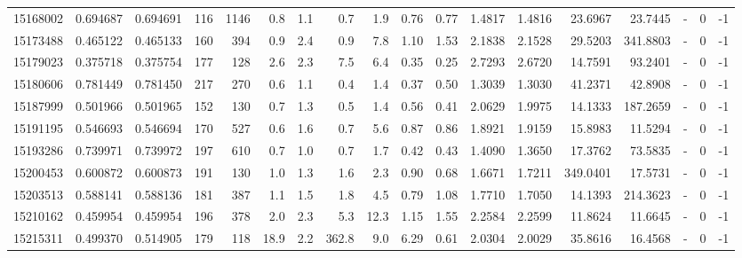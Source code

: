 \begin{tabular}{rrrrrrrrrrrrrrrlrr}
  15168002 & 0.694687 &   0.694691 &  116 & 1146 &      0.8 &      1.1 &     0.7 &      1.9 &       0.76 &        0.77 &  1.4817 &  1.4816 &   23.6967 &   23.7445 &             - &        0 &         -1 \\
  15173488 & 0.465122 &   0.465133 &  160 &  394 &      0.9 &      2.4 &     0.9 &      7.8 &       1.10 &        1.53 &  2.1838 &  2.1528 &   29.5203 &  341.8803 &             - &        0 &         -1 \\
  15179023 & 0.375718 &   0.375754 &  177 &  128 &      2.6 &      2.3 &     7.5 &      6.4 &       0.35 &        0.25 &  2.7293 &  2.6720 &   14.7591 &   93.2401 &             - &        0 &         -1 \\
  15180606 & 0.781449 &   0.781450 &  217 &  270 &      0.6 &      1.1 &     0.4 &      1.4 &       0.37 &        0.50 &  1.3039 &  1.3030 &   41.2371 &   42.8908 &             - &        0 &         -1 \\
  15187999 & 0.501966 &   0.501965 &  152 &  130 &      0.7 &      1.3 &     0.5 &      1.4 &       0.56 &        0.41 &  2.0629 &  1.9975 &   14.1333 &  187.2659 &             - &        0 &         -1 \\
  15191195 & 0.546693 &   0.546694 &  170 &  527 &      0.6 &      1.6 &     0.7 &      5.6 &       0.87 &        0.86 &  1.8921 &  1.9159 &   15.8983 &   11.5294 &             - &        0 &         -1 \\
  15193286 & 0.739971 &   0.739972 &  197 &  610 &      0.7 &      1.0 &     0.7 &      1.7 &       0.42 &        0.43 &  1.4090 &  1.3650 &   17.3762 &   73.5835 &             - &        0 &         -1 \\
  15200453 & 0.600872 &   0.600873 &  191 &  130 &      1.0 &      1.3 &     1.6 &      2.3 &       0.90 &        0.68 &  1.6671 &  1.7211 &  349.0401 &   17.5731 &             - &        0 &         -1 \\
  15203513 & 0.588141 &   0.588136 &  181 &  387 &      1.1 &      1.5 &     1.8 &      4.5 &       0.79 &        1.08 &  1.7710 &  1.7050 &   14.1393 &  214.3623 &             - &        0 &         -1 \\
  15210162 & 0.459954 &   0.459954 &  196 &  378 &      2.0 &      2.3 &     5.3 &     12.3 &       1.15 &        1.55 &  2.2584 &  2.2599 &   11.8624 &   11.6645 &             - &        0 &         -1 \\
  15215311 & 0.499370 &   0.514905 &  179 &  118 &     18.9 &      2.2 &   362.8 &      9.0 &       6.29 &        0.61 &  2.0304 &  2.0029 &   35.8616 &   16.4568 &             - &        0 &         -1 \\

\end{tabular}
